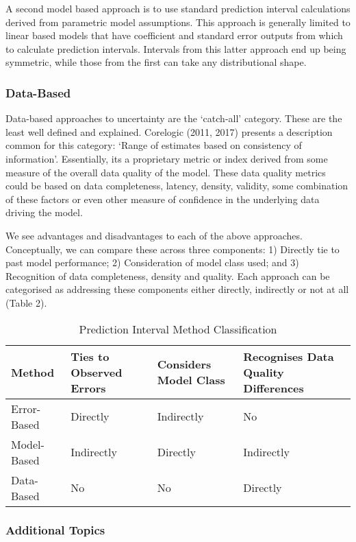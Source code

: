\documentclass[colTwo]{anon}
\theoremstyle{definition}
\begin{document}
A second model based approach is to use standard prediction interval calculations derived from parametric model assumptions.  This approach is generally limited to linear based models that have coefficient and standard error outputs from which to calculate prediction intervals.  Intervals from this latter approach end up being symmetric, while those from the first can take any distributional shape. 

\subsubsection{Data-Based}

Data-based approaches to uncertainty are the ‘catch-all’ category.  These are the least well defined and explained.  Corelogic (2011, 2017) presents a description common for this category: ‘Range of estimates based on consistency of information’.  Essentially, its a proprietary metric or index derived from some measure of the overall data quality of the model.  These data quality metrics could be based on data completeness, latency, density, validity, some combination of these factors or even other measure of confidence in the underlying data driving the model.  

We see advantages and disadvantages to each of the above approaches.   Conceptually, we can compare these across three components: 1) Directly tie to past model performance; 2) Consideration of model class used; and 3) Recognition of data completeness, density and quality.  Each approach can be categorised as addressing these components either directly, indirectly or not at all (Table 2).  

\begin{table}[h!]
\centering
\begin{tabular}{|p{1.2cm} | p{1.6cm} | p{1.6cm} | p{1.6cm} |} 
 \hline
  \textbf{Method} & \textbf{Ties to Observed Errors} & \textbf{Considers Model Class} & \textbf{Recognises Data Quality Differences} \\ [0.5ex] 
 \hline
 Error-Based & Directly & Indirectly & No \\ 
 \hline
 Model-Based & Indirectly & Directly & Indirectly \\
 \hline
 Data-Based & No & No & Directly \\
 \hline
\end{tabular}
\caption{Prediction Interval Method Classification}
\label{table:2}
\end{table}

\subsubsection{Additional Topics}
\end{document}
